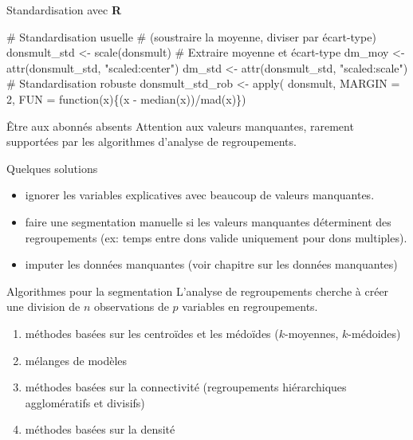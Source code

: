 \documentclass[
  ignorenonframetext,
]{beamer}
\newenvironment{Shaded}{\begin{snugshade}}{\end{snugshade}}
\newcommand{\AttributeTok}[1]{\textcolor[rgb]{0.40,0.45,0.13}{#1}}
\newcommand{\CommentTok}[1]{\textcolor[rgb]{0.37,0.37,0.37}{#1}}
\newcommand{\ControlFlowTok}[1]{\textcolor[rgb]{0.00,0.23,0.31}{#1}}
\newcommand{\DecValTok}[1]{\textcolor[rgb]{0.68,0.00,0.00}{#1}}
\newcommand{\FunctionTok}[1]{\textcolor[rgb]{0.28,0.35,0.67}{#1}}
\newcommand{\NormalTok}[1]{\textcolor[rgb]{0.00,0.23,0.31}{#1}}
\newcommand{\OtherTok}[1]{\textcolor[rgb]{0.00,0.23,0.31}{#1}}
\newcommand{\SpecialCharTok}[1]{\textcolor[rgb]{0.37,0.37,0.37}{#1}}
\newcommand{\StringTok}[1]{\textcolor[rgb]{0.13,0.47,0.30}{#1}}
\providecommand{\tightlist}{%
  \setlength{\itemsep}{0pt}\setlength{\parskip}{0pt}}\usepackage{longtable,booktabs,array}
\begin{document}
\begin{frame}[fragile]{Standardisation avec \textbf{R}}
\protect\hypertarget{standardisation-avec-r}{}
\begin{Shaded}
\begin{Highlighting}[numbers=left,,]
\CommentTok{\# Standardisation usuelle}
\CommentTok{\# (soustraire la moyenne, diviser par écart{-}type)}
\NormalTok{donsmult\_std }\OtherTok{\textless{}{-}} \FunctionTok{scale}\NormalTok{(donsmult)}
\CommentTok{\# Extraire moyenne et écart{-}type}
\NormalTok{dm\_moy }\OtherTok{\textless{}{-}} \FunctionTok{attr}\NormalTok{(donsmult\_std, }\StringTok{"scaled:center"}\NormalTok{)}
\NormalTok{dm\_std }\OtherTok{\textless{}{-}} \FunctionTok{attr}\NormalTok{(donsmult\_std, }\StringTok{"scaled:scale"}\NormalTok{)}
\CommentTok{\# Standardisation robuste}
\NormalTok{donsmult\_std\_rob }\OtherTok{\textless{}{-}} \FunctionTok{apply}\NormalTok{(}
\NormalTok{  donsmult,}
  \AttributeTok{MARGIN =} \DecValTok{2}\NormalTok{,}
  \AttributeTok{FUN =} \ControlFlowTok{function}\NormalTok{(x)\{(x }\SpecialCharTok{{-}} \FunctionTok{median}\NormalTok{(x))}\SpecialCharTok{/}\FunctionTok{mad}\NormalTok{(x)\})}
\end{Highlighting}
\end{Shaded}
\end{frame}

\begin{frame}{Être aux abonnés absents}
\protect\hypertarget{uxeatre-aux-abonnuxe9s-absents}{}
Attention aux valeurs manquantes, rarement supportées par les
algorithmes d'analyse de regroupements.

Quelques solutions

\begin{itemize}
\tightlist
\item
  ignorer les variables explicatives avec beaucoup de valeurs
  manquantes.
\item
  faire une segmentation manuelle si les valeurs manquantes déterminent
  des regroupements (ex: temps entre dons valide uniquement pour dons
  multiples).
\item
  imputer les données manquantes (voir chapitre sur les données
  manquantes)
\end{itemize}
\end{frame}

\begin{frame}{Algorithmes pour la segmentation}
\protect\hypertarget{algorithmes-pour-la-segmentation}{}
L'analyse de regroupements cherche à créer une division de \(n\)
observations de \(p\) variables en regroupements.

\begin{enumerate}
\tightlist
\item
  méthodes basées sur les centroïdes et les médoïdes (\(k\)-moyennes,
  \(k\)-médoides)
\item
  mélanges de modèles
\item
  méthodes basées sur la connectivité (regroupements hiérarchiques
  agglomératifs et divisifs)
\item
  méthodes basées sur la densité
\end{enumerate}
\end{frame}
\end{document}
